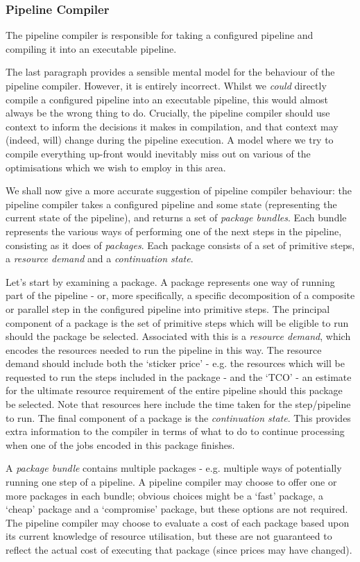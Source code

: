 \documentclass[10pt,a4paper]{article}
\newcommand{\npar}{\par\noindent\space}
\begin{document}
\subsubsection{Pipeline Compiler}
\label{sec:pipelineCompiler}
\npar The pipeline compiler is responsible for taking a \gls{configured pipeline} and compiling it into an \gls{executable pipeline}.
\npar The last paragraph provides a sensible mental model for the behaviour of the pipeline compiler. However, it is entirely incorrect. Whilst we \textit{could} directly compile a configured pipeline into an executable pipeline, this would almost always be the wrong thing to do. Crucially, the pipeline compiler should use context to inform the decisions it makes in compilation, and that context may (indeed, will) change during the pipeline execution. A model where we try to compile everything up-front would inevitably miss out on various of the optimisations which we wish to employ in this area.
\npar We shall now give a more accurate suggestion of pipeline compiler behaviour: the pipeline compiler takes a \gls{configured pipeline} and some state (representing the current state of the pipeline), and returns a set of \textit{package bundles}. Each bundle represents the various ways of performing one of the next steps in the pipeline, consisting as it does of \textit{packages}. Each package consists of a set of \glspl{primitive step}, a \textit{resource demand} and a \textit{continuation state}.
\npar Let's start by examining a package. A package represents one way of running part of the pipeline - or, more specifically, a specific decomposition of a composite or parallel step in the configured pipeline into primitive steps. The principal component of a package is the set of primitive steps which will be eligible to run should the package be selected. Associated with this is a \textit{resource demand}, which encodes the resources needed to run the pipeline in this way. The resource demand should include both the `sticker price' - e.g. the resources which will be requested to run the steps included in the package - and the `TCO' - an estimate for the ultimate resource requirement of the entire pipeline should this package be selected. Note that resources here include the time taken for the step/pipeline to run. The final component of a package is the \textit{continuation state}. This provides extra information to the compiler in terms of what to do to continue processing when one of the jobs encoded in this package finishes.
\npar A \textit{package bundle} contains multiple packages - e.g. multiple ways of potentially running one step of a pipeline. A pipeline compiler may choose to offer one or more packages in each bundle; obvious choices might be a `fast' package, a `cheap' package and a `compromise' package, but these options are not required. The pipeline compiler may choose to evaluate a cost of each package based upon its current knowledge of \gls{resource} utilisation, but these are not guaranteed to reflect the actual cost of executing that package (since prices may have changed).
\end{document}
